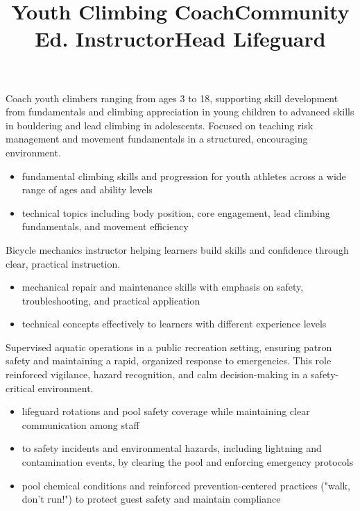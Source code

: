 \documentclass[resmargin, centered, 10pt]{../res}
\begin{document}
\begin{resume}
\title{Youth Climbing Coach}
\begin{position}
	Coach youth climbers ranging from ages 3 to 18, supporting skill development from fundamentals and climbing appreciation in young children to advanced skills in bouldering and lead climbing in adolescents. Focused on teaching risk management and movement fundamentals in a structured, encouraging environment. \\
	\begin{itemize}
		\item {} fundamental climbing skills and progression for youth athletes across a wide range of ages and ability levels
		\item {} technical topics including body position, core engagement, lead climbing fundamentals, and movement efficiency
	\end{itemize}
\end{position}

\title{Community Ed. Instructor}
\begin{position}
	Bicycle mechanics instructor helping learners build skills and confidence through clear, practical instruction. \\
	\begin{itemize}
		\item {} mechanical repair and maintenance skills with emphasis on safety, troubleshooting, and practical application
		\item {} technical concepts effectively to learners with different experience levels
	\end{itemize}
\end{position}

\title{Head Lifeguard}
\begin{position}
	Supervised aquatic operations in a public recreation setting, ensuring patron safety and maintaining a rapid, organized response to emergencies. This role reinforced vigilance, hazard recognition, and calm decision-making in a safety-critical environment. \\
	\begin{itemize}
		\item {} lifeguard rotations and pool safety coverage while maintaining clear communication among staff
		\item {} to safety incidents and environmental hazards, including lightning and contamination events, by clearing the pool and enforcing emergency protocols
		\item {} pool chemical conditions and reinforced prevention-centered practices ("walk, don't run!") to protect guest safety and maintain compliance
	\end{itemize}
\end{position}


\end{resume}
\end{document}

